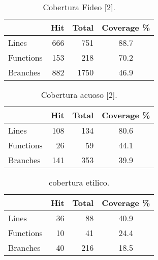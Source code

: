 \begin{table}[!htf]
    \begin{center}
    \begin{tabular}{|l|r|r|c|}
        \hline
        & \textbf{Hit} & \textbf{Total} & \textbf{Coverage \%} \\
        \hline
        Lines & 666 & 751 & 88.7 \\
        \hline
        Functions & 153 & 218 & 70.2 \\
        \hline
        Branches & 882 & 1750 & 46.9 \\
        \hline            
    \end{tabular}
    \caption{Cobertura Fideo [2].}
    \label{coberturaFideo}
    \end{center}
\end{table}

\begin{table}[!htf]
    \begin{center}
    \begin{tabular}{|l|r|r|c|}
        \hline
        & \textbf{Hit} & \textbf{Total} & \textbf{Coverage \%} \\
        \hline
        Lines & 108 & 134 & 80.6 \\
        \hline
        Functions & 26 & 59 & 44.1 \\
        \hline
        Branches & 141 & 353 & 39.9 \\
        \hline            
    \end{tabular}
    \caption{Cobertura acuoso [2].}
    \label{coberturaAcuoso}
    \end{center}
\end{table}

\begin{table}[!htf]
    \begin{center}
    \begin{tabular}{|l|r|r|c|}
        \hline
        & \textbf{Hit} & \textbf{Total} & \textbf{Coverage \%} \\
        \hline
        Lines & 36 & 88 & 40.9 \\
        \hline
        Functions & 10 & 41 & 24.4 \\
        \hline
        Branches & 40 & 216 & 18.5 \\
        \hline            
    \end{tabular}
    \caption{cobertura etilico.}
    \label{coberturaEtilico}
    \end{center}
\end{table}

